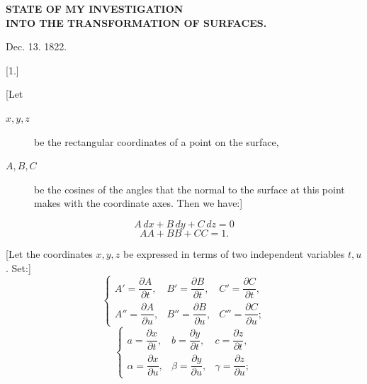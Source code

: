\clearpage
{}%
\begin{center}\large\bfseries STATE OF MY INVESTIGATION\\ INTO THE TRANSFORMATION OF SURFACES.\end{center}
\begin{center}Dec. 13. 1822.\end{center}
\begin{center}[1.]\end{center}

[Let
\begin{description}
\item[$x,y,z$] be the rectangular coordinates of a point on the surface,
\item[$A,B,C$] be the cosines of the angles that the normal to the surface at this point makes with the coordinate axes. Then we have:]
\end{description}
\begin{equation}\tag*{[1]} A\,dx+B\,dy+C\,dz=0\end{equation}
\begin{equation}\tag*{[2]} AA+BB+CC=1.\end{equation}

[Let the coordinates $x,y,z$ be expressed in terms of two independent variables $t,u$. Set:]
\begin{equation}\tag*{[3]}
\left\{\begin{array}{lll}
A'=\dfrac{\partial A}{\partial t},&B'=\dfrac{\partial B}{\partial t},&C'=\dfrac{\partial C}{\partial t},\\[6pt]
A''=\dfrac{\partial A}{\partial u},&B''=\dfrac{\partial B}{\partial u},&C''=\dfrac{\partial C}{\partial u};
\end{array}\right.
\end{equation}
\begin{equation}\tag*{[4]}
\left\{\begin{array}{lll}
a=\dfrac{\partial x}{\partial t},&b=\dfrac{\partial y}{\partial t},&c=\dfrac{\partial z}{\partial t},\\[6pt]
\alpha=\dfrac{\partial x}{\partial u},&\beta=\dfrac{\partial y}{\partial u},&\gamma=\dfrac{\partial z}{\partial u};
\end{array}\right.
\end{equation}
